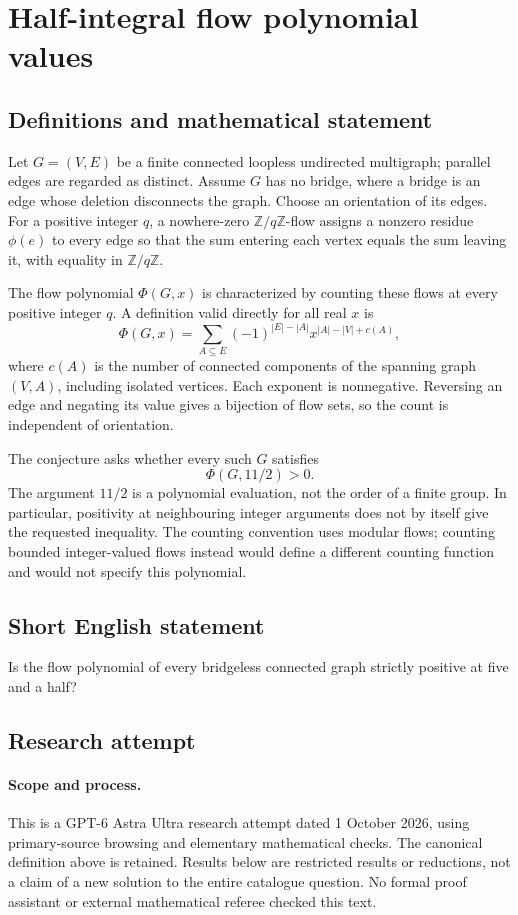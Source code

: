 \documentclass[11pt,a4paper]{article}
\begin{document}
\section*{Half-integral flow polynomial values}\label{statement}

\subsection{Definitions and mathematical statement}
Let $G=(V,E)$ be a finite connected loopless undirected multigraph;
parallel edges are regarded as distinct. Assume $G$ has no bridge,
where a bridge is an edge whose deletion disconnects the graph.
Choose an orientation of its edges. For a positive integer $q$, a
nowhere-zero $\mathbb Z/q\mathbb Z$-flow assigns a nonzero residue
$\phi(e)$ to every edge so that the sum entering each vertex equals
the sum leaving it, with equality in $\mathbb Z/q\mathbb Z$.

The flow polynomial $\Phi(G,x)$ is characterized by counting these
flows at every positive integer $q$. A definition valid directly
for all real $x$ is
\[
 \Phi(G,x)=\sum_{A\subseteq E}(-1)^{|E|-|A|}
 x^{|A|-|V|+c(A)},
\]
where $c(A)$ is the number of connected components of the spanning
graph $(V,A)$, including isolated vertices. Each exponent is
nonnegative. Reversing an edge and negating its value gives a
bijection of flow sets, so the count is independent of orientation.

The conjecture asks whether every such $G$ satisfies
\[
 \Phi(G,11/2)>0.
\]
The argument $11/2$ is a polynomial evaluation, not the order of
a finite group. In particular, positivity at neighbouring integer
arguments does not by itself give the requested inequality.
The counting convention uses modular flows; counting bounded
integer-valued flows instead would define a different counting
function and would not specify this polynomial.
\subsection{Short English statement}
Is the flow polynomial of every bridgeless connected graph strictly positive at five and a half?
\subsection{Research attempt}
\paragraph{Scope and process.}
This is a GPT-6 Astra Ultra research attempt dated 1 October 2026, using
primary-source browsing and elementary mathematical checks. The canonical
definition above is retained. Results below are restricted results or
reductions, not a claim of a new solution to the entire catalogue question.
No formal proof assistant or external mathematical referee checked this text.
\end{document}
